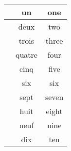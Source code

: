 \documentclass{article}
\begin{document}
\begin{tcolorbox}[colback=white, colframe=black, boxrule=1pt, width=\textwidth]
    \begin{tabular}{|c|c|c|}
        \hline
        \cellcolor{red!30} & un & one \\
        \hline
        \cellcolor{red!30} & deux & two \\
        \hline
        \cellcolor{red!30} & trois & three \\
        \hline
        \cellcolor{red!30} & quatre & four \\
        \hline
        \cellcolor{red!30} & cinq & five \\
        \hline
        \cellcolor{red!30} & six & six \\
        \hline
        \cellcolor{red!30} & sept & seven \\
        \hline
        \cellcolor{red!30} & huit & eight \\
        \hline
        \cellcolor{red!30} & neuf & nine \\
        \hline
        \cellcolor{red!30} & dix & ten \\
        \hline
    \end{tabular}
\end{tcolorbox}
\end{document}
